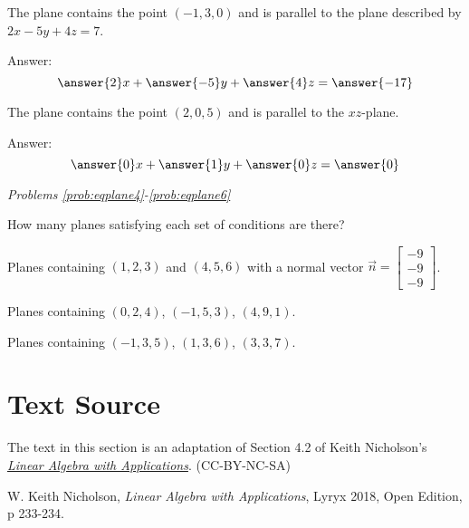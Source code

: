 \documentclass{ximera}
\begin{document}
  \begin{problem}\label{prob:eqplane2}
  The plane contains the point $(-1, 3, 0)$ and is parallel to the plane described by $2x-5y+4z=7$.
   
  Answer:
  $$\answer{2}x+\answer{-5}y+\answer{4}z=\answer{-17}$$
  \end{problem}
   
  \begin{problem}\label{prob:eqplane3}
  The plane contains the point $(2, 0, 5)$ and is parallel to the $xz$-plane.
   
  Answer:
  $$\answer{0}x+\answer{1}y+\answer{0}z=\answer{0}$$
  \end{problem}
 
 
 
\emph{Problems \ref{prob:eqplane4}-\ref{prob:eqplane6}}
 
How many planes satisfying each set of conditions are there?
 
\begin{problem}\label{prob:eqplane4}
Planes containing $(1, 2, 3)$ and $(4, 5, 6)$ with a normal vector $\vec{n}=\begin{bmatrix}-9\\-9\\-9\end{bmatrix}$.
\begin{multipleChoice}
 \end{multipleChoice}
\end{problem}
 
\begin{problem}\label{prob:eqplane5}
Planes containing $(0,2, 4)$, $(-1, 5, 3)$, $(4, 9, 1)$.
\begin{multipleChoice}
 \end{multipleChoice}
\end{problem}
 
\begin{problem}\label{prob:eqplane6}
Planes containing $(-1, 3, 5)$, $(1, 3, 6)$, $(3, 3, 7)$.
\begin{multipleChoice}
 \end{multipleChoice}
\end{problem}
 
 
 
\section*{Text Source}
The text in this section is an adaptation of Section 4.2 of Keith Nicholson's \href{https://open.umn.edu/opentextbooks/textbooks/linear-algebra-with-applications}{\it Linear Algebra with Applications}. (CC-BY-NC-SA)
 
W. Keith Nicholson, {\it Linear Algebra with Applications}, Lyryx 2018, Open Edition, p 233-234.
 
\end{document}
